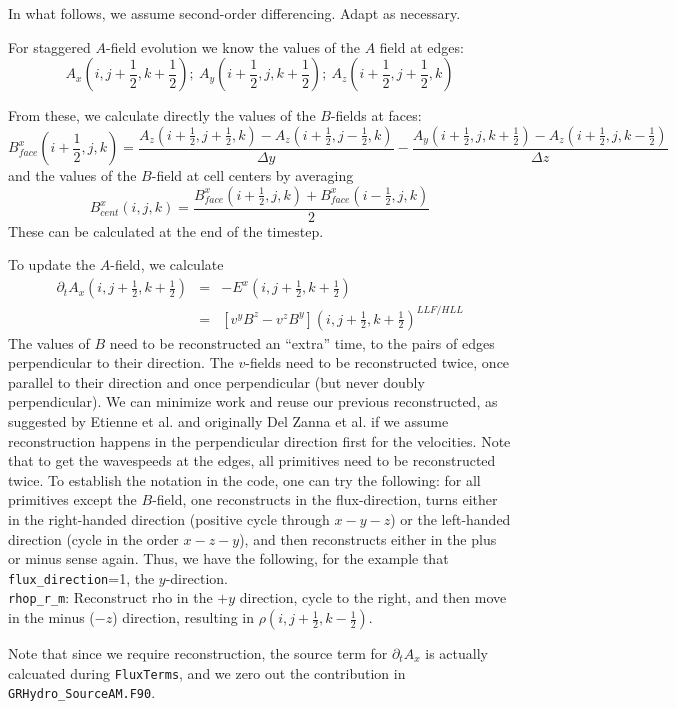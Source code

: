 \documentclass{article}
\begin{document}
In what follows, we assume second-order differencing.  Adapt as necessary.

For staggered $A$-field evolution we know the values of the $A$ field at edges:
\begin{equation}
A_x(i,j+\frac{1}{2},k+\frac{1}{2});~A_y(i+\frac{1}{2},j,k+\frac{1}{2});~A_z(i+\frac{1}{2},j+\frac{1}{2},k)
\end{equation}

From these, we calculate directly the values of the $B$-fields at faces:
\begin{equation}
B_{face}^x(i+\frac{1}{2},j,k) =\frac{A_z(i+\frac{1}{2},j+\frac{1}{2},k)-A_z(i+\frac{1}{2},j-\frac{1}{2},k)}{\Delta y}-
\frac{A_y(i+\frac{1}{2},j,k+\frac{1}{2})-A_z(i+\frac{1}{2},j,k-\frac{1}{2})}{\Delta z}
\end{equation}
and the values of the $B$-field at cell centers by averaging
\begin{equation}
B_{cent}^x(i,j,k)=\frac{B_{face}^x(i+\frac{1}{2},j,k)+B_{face}^x(i-\frac{1}{2},j,k)}{2}
\end{equation}
These can be calculated at the end of the timestep.

To update the $A$-field, we calculate
\begin{eqnarray}
\partial_t A_x(i,j+\frac{1}{2},k+\frac{1}{2})& =& -E^x(i,j+\frac{1}{2},k+\frac{1}{2})\\
&=&[v^y B^z-v^z B^y](i,j+\frac{1}{2},k+\frac{1}{2})^{LLF/HLL}
\end{eqnarray}
The values of $B$ need to be reconstructed an ``extra'' time, to the pairs of edges perpendicular to their direction.  The $v$-fields need to be reconstructed twice, once parallel to their direction and once perpendicular (but never doubly perpendicular).  We can minimize work and reuse our previous reconstructed, as suggested by Etienne et al. and originally Del Zanna et al. if we assume reconstruction happens in the perpendicular direction first for the velocities.  Note that to get the wavespeeds at the edges, all primitives need to be reconstructed twice.  To establish the notation in the code, one can try the following: for all primitives except the $B$-field, one reconstructs in the flux-direction, turns either in the right-handed direction (positive cycle through $x-y-z$) or the left-handed direction (cycle in the order $x-z-y$), and then reconstructs either in the plus or minus sense again.  Thus, we have the following,  for the example that {\tt flux\_direction}=1, the $y$-direction.\\

{\tt rhop\_r\_m}: Reconstruct rho in the $+y$ direction, cycle to the right, and then move in the minus ($-z$) direction, resulting in $\rho(i,j+\frac{1}{2},k-\frac{1}{2})$.

Note that since we require reconstruction, the source term for $\partial_t A_x$ is actually calcuated during {\tt FluxTerms}, and we zero out the contribution in {\tt GRHydro\_SourceAM.F90}.
\end{document}
